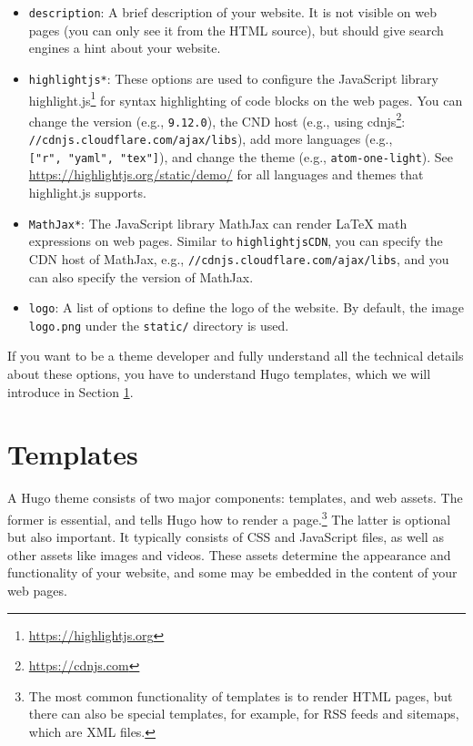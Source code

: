 \documentclass[12pt,]{krantz}
\renewcommand{\href}[2]{#2\footnote{\url{#1}}}
\theoremstyle{definition}
\theoremstyle{definition}
\theoremstyle{definition}
\theoremstyle{remark}
\begin{document}
\begin{itemize}
  \begin{itemize}
  \item
    \texttt{description}: A brief description of your website. It is not
    visible on web pages (you can only see it from the HTML source), but
    should give search engines a hint about your website.
  \item
    \texttt{highlightjs*}: These options are used to configure the
    JavaScript library
    \href{https://highlightjs.org}{highlight.js} for syntax highlighting
    of code blocks on the web pages. You can change the version (e.g.,
    \texttt{9.12.0}), the CND host (e.g., using
    \href{https://cdnjs.com}{cdnjs}:
    \texttt{//cdnjs.cloudflare.com/ajax/libs}), add more languages
    (e.g., \texttt{{[}"r",\ "yaml",\ "tex"{]}}), and change the theme
    (e.g., \texttt{atom-one-light}). See
    \url{https://highlightjs.org/static/demo/} for all languages and
    themes that highlight.js supports.
  \item
    \texttt{MathJax*}: The JavaScript library MathJax can
    render LaTeX math expressions on web pages. Similar to
    \texttt{highlightjsCDN}, you can specify the CDN host of MathJax,
    e.g., \texttt{//cdnjs.cloudflare.com/ajax/libs}, and you can also
    specify the version of MathJax.
  \item
    \texttt{logo}: A list of options to define the logo of
    the website. By default, the image \texttt{logo.png} under the
    \texttt{static/} directory is used.
  \end{itemize}
\end{itemize}

If you want to be a theme developer and fully understand all the
technical details about these options, you have to understand Hugo
templates, which we will introduce in Section \ref{templates}.

\section{Templates}\label{templates}

A Hugo theme consists of two major components:
templates, and web assets. The former is essential, and
tells Hugo how to render a page.\footnote{The most common functionality
  of templates is to render HTML pages, but there can also be special
  templates, for example, for RSS feeds and sitemaps, which are XML
  files.} The latter is optional but also important. It typically
consists of CSS and JavaScript files, as well as other assets like
images and videos. These assets determine the appearance and
functionality of your website, and some may be embedded in the content
of your web pages.
\end{document}
